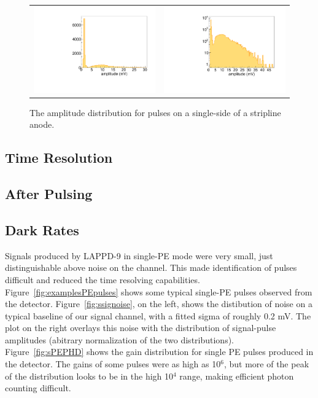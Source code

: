 \documentclass[preprint,12pt]{elsarticle}
\begin{document}
\begin{figure}
	\centering
        \begin{tabular}{l l}
                \includegraphics[width=0.52\linewidth]{plots/Amplitudes_notlog} &
                \includegraphics[width=0.53\linewidth]{plots/Amplitudes}\\
         \end{tabular}  
       \caption{The amplitude distribution for pulses on a single-side of a stripline anode.}
	\label{fig:amp}
\end{figure}

\subsection{Time Resolution}


\subsection{After Pulsing}

\subsection{Dark Rates}

\noindent Signals produced by LAPPD-9 in single-PE mode were very small, just distinguishable above noise on the channel. This made identification of pulses difficult and reduced the time resolving capabilities. Figure~\ref{fig:examplesPEpulses} shows some typical single-PE pulses observed from the detector. Figure~\ref{fig:ssignoise}, on the left, shows the distibution of noise on a typical baseline of our signal channel, with a fitted sigma of roughly 0.2 mV. The plot on the right overlays this noise with the distribution of signal-pulse amplitudes (abitrary normalization of the two distributions). Figure~\ref{fig:sPEPHD} shows the gain distribution for single PE pulses produced in the detector. The gains of some pulses  were as high as 10$^6$, but more of the peak of the distribution looks to be in the high 10$^4$ range, making efficient photon counting difficult.
\end{document}
